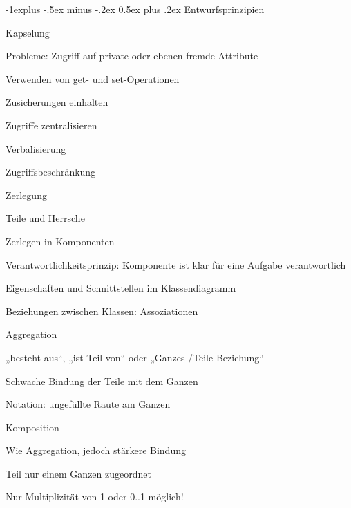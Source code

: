 \documentclass[a4paper]{article}
\makeatletter
\renewcommand{\subsection}{\@startsection{subsection}{2}{0mm}%
                                {-1explus -.5ex minus -.2ex}%
                                {0.5ex plus .2ex}%
                                {\normalfont\normalsize\bfseries}}
\makeatother
\begin{document}
\begin{multicols}{3}
  \subsection{Entwurfsprinzipien}
  \begin{itemize*}
    \item Kapselung
          \begin{itemize*}
            \item Probleme: Zugriff auf private oder ebenen-fremde Attribute
            \item Verwenden von get- und set-Operationen
            \item Zusicherungen einhalten
            \item Zugriffe zentralisieren
            \item Verbalisierung
            \item Zugriffsbeschränkung
          \end{itemize*}
    \item Zerlegung
          \begin{itemize*}
            \item Teile und Herrsche
            \item Zerlegen in Komponenten
            \item Verantwortlichkeitsprinzip: Komponente ist klar für eine Aufgabe verantwortlich
            \item Eigenschaften und Schnittstellen im Klassendiagramm
            \item Beziehungen zwischen Klassen: Assoziationen
            \item Aggregation
                  \begin{itemize*}
                    \item „besteht aus“, „ist Teil von“ oder „Ganzes-/Teile-Beziehung“
                    \item Schwache Bindung der Teile mit dem Ganzen
                    \item Notation: ungefüllte Raute am Ganzen
                  \end{itemize*}
            \item Komposition
                  \begin{itemize*}
                    \item Wie Aggregation, jedoch stärkere Bindung
                    \item Teil nur einem Ganzen zugeordnet
                    \item Nur Multiplizität von 1 oder 0..1 möglich!

\end{itemize*}
\end{itemize*}
\end{itemize*}
\end{multicols}
\end{document}
